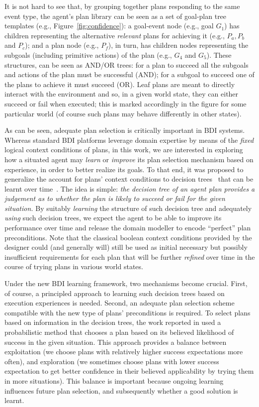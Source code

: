 It is not hard to see that, by grouping together plans responding to the same event type, the agent's plan library can be seen as
a set of goal-plan tree templates (e.g., Figure~\ref{fig:confidence}): a goal-event node (e.g., goal $G_1$) has children representing the alternative \emph{relevant} plans for achieving it (e.g., $P_a,P_b$ and $P_c$); and a plan node (e.g., $P_f$), in turn, has children nodes representing the subgoals (including primitive actions) of the plan (e.g., $G_4$ and $G_5$). These structures, can be seen as AND/OR trees: for a plan to succeed all the subgoals and actions of the plan must be successful (AND); for a subgoal to succeed one of the plans to achieve it must succeed (OR). Leaf plans are meant to directly interact with the environment and so, in a given world state, they can either succeed or fail when executed; this is marked accordingly in the figure for some particular world (of course such plans may behave differently in other states).


As can be seen, adequate plan selection is critically important in BDI systems. Whereas standard BDI platforms leverage domain expertise by means of the \emph{fixed} logical context conditions of plans, in this work, we are interested in exploring how a situated agent may \emph{learn} or \emph{improve} its plan selection mechanism based on experience, in order to better realize its goals.
To that end, it was proposed to generalize the account for plans' context conditions to decision trees~\cite{Mitchell97:ML} that can be learnt over time~\cite{airiau09:enhancing,singh10:extending,singh10:learning}. The idea is simple: \emph{the decision tree of an agent plan provides a judgement as to whether the plan is likely to succeed or fail for the given situation.}
By suitably \emph{learning} the structure of such decision tree and adequately \emph{using} such decision trees, we expect the agent to be able to improve its performance over time and release the domain modeller to encode ``perfect'' plan preconditions. Note that the classical boolean context conditions provided by the designer could (and generally will) still be used as initial necessary but possibly insufficient requirements for each plan that will be further \emph{refined} over time in the course of trying plans in various world states.


Under the new BDI learning framework, two mechanisms become crucial. First, of course, a principled approach to learning such decision trees based on execution experiences is needed. Second, an adequate plan selection scheme compatible with the new type of plans' preconditions is required.
To select plans based on information in the decision trees, the work reported in \cite{singh10:extending,singh10:learning} used a probabilistic method that chooses a plan based on its believed likelihood of success in the given situation. This approach provides a balance between exploitation (we choose plans with relatively higher success expectations more often), and exploration (we sometimes choose plans with lower success expectation to get better confidence in their believed applicability by trying them in more situations). This balance is important because ongoing learning influences future plan selection, and subsequently whether a good solution is learnt.


